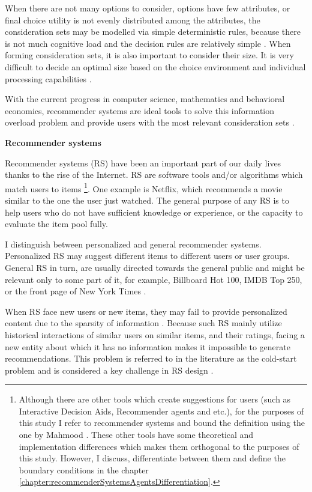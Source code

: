 \documentclass[a4paper,12pt]{article}
\newcommand{\citeyearonly}[1]{\citeyearpar{#1}}
\begin{document}
When there are not many options to consider, options have few attributes, or final choice utility is not evenly distributed among the attributes, the consideration sets may be modelled via simple deterministic rules, because there is not much cognitive load and the decision rules are relatively simple  \citep{hauser2014consideration, lee2004effect} . When forming consideration sets, it is also important to consider their size. It is very difficult to decide an optimal size based on the choice environment and individual processing capabilities \citep{de2011modelling}. 

With the current progress in computer science, mathematics and behavioral economics, recommender systems are ideal tools to solve this information overload problem and provide users with the most relevant consideration sets \citep{breese2013empirical}.

    
\textbf{Recommender systems}    

Recommender systems (RS) have been an important part of our daily lives thanks to the rise of the Internet. RS are software tools and/or algorithms which match users to items \citep{mahmood2009improving} \footnote{Although there are other tools which create suggestions for users (such as Interactive Decision Aids, Recommender agents and etc.), for the purposes of this study I refer to recommender systems and bound the definition using the one by Mahmood \citeyearonly{mahmood2009improving}. These other tools have some theoretical and implementation differences which makes them orthogonal to the purposes of this study. However, I discuss, differentiate between them and define the boundary conditions in the chapter \ref{chapter:recommenderSystemsAgentsDifferentiation}.}. One example is Netflix, which recommends a movie similar to the one the user just watched. The general purpose of any RS is to help users who do not have sufficient knowledge or experience, or the capacity to evaluate the item pool fully. 

I distinguish between personalized and general recommender systems. Personalized RS  may suggest different items to different users or user groups. General RS in turn, are usually directed towards the general public and might be relevant only to some part of it, for example, Billboard Hot 100, IMDB Top 250, or the front page of New York Times \citep{ricci2010recsystems}.

When RS face new users or new items, they may fail to provide personalized content due to the sparsity of information \citep{lika2014facing}. Because such RS mainly utilize historical interactions of similar users on similar items, and their ratings, facing a new entity about which it has no information makes it impossible to generate recommendations. This problem is referred to in the literature as the cold-start problem \citep{adomavicius2005toward} and is considered a key challenge in RS design \citep{park2009pairwise}.
\end{document}
